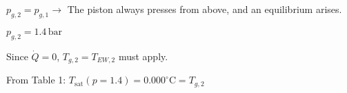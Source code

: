 \( p_{g,2} = p_{g,1} \rightarrow \) The piston always presses from above, and an equilibrium arises.  

\( p_{g,2} = 1.4 \, \text{bar} \)  

Since \( \dot{Q} = 0 \), \( T_{g,2} = T_{EW,2} \) must apply.  

From Table 1:  
\( T_{\text{sat}} (p = 1.4) = 0.000^\circ \text{C} = T_{g,2} \)
